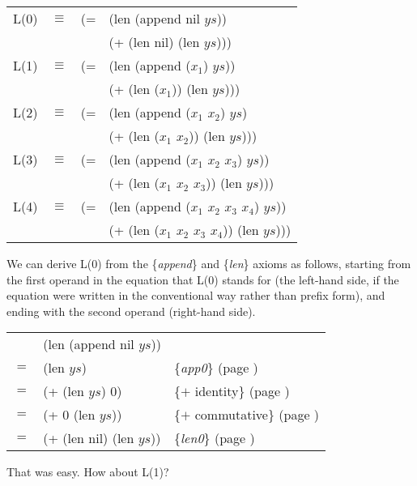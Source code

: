 \begin{center}
\begin{tabular}{llll}
L(0) & $\equiv$ & (= &(len (append nil $ys$)) \\
     &          &    &(+ (len nil) (len $ys$))) \\
L(1) & $\equiv$ & (= &(len (append ($x_1$) $ys$)) \\
     &          &    &(+ (len ($x_1$)) (len $ys$))) \\
L(2) & $\equiv$ & (= &(len (append ($x_1$ $x_2$) $ys$) 	\\
	 &          &    &(+ (len ($x_1$ $x_2$)) (len $ys$))) \\
L(3) & $\equiv$ & (= &(len (append ($x_1$ $x_2$ $x_3$) $ys$)) \\
     &          &    &(+ (len ($x_1$ $x_2$ $x_3$)) (len $ys$))) \\
L(4) & $\equiv$ & (= &(len (append ($x_1$ $x_2$ $x_3$ $x_4$) $ys$)) \\
     &          &    &(+ (len ($x_1$ $x_2$ $x_3$ $x_4$)) (len $ys$)))
\end{tabular}
\end{center}

We can derive L(0) from the \{\emph{append}\} and \{\emph{len}\} axioms as follows, 
starting from the first operand in the equation that L(0) stands for 
(the left-hand side, if the equation were written in the conventional way rather than prefix form), 
and ending with the second operand (right-hand side).

\begin{center}
\begin{tabular}{lll}
    & (len (append nil $ys$))  &                                                \\
$=$ & (len $ys$)               & \{\emph{app0}\}     (page \pageref{append-equations})\\
$=$ & (+ (len $ys$) 0)         & \{$+$ identity\}    (page \pageref{fig-02-01}) \\
$=$ & (+ 0 (len $ys$))         & \{$+$ commutative\} (page \pageref{fig-02-01}) \\
$=$ & (+ (len nil) (len $ys$)) & \{\emph{len0}\}     (page \pageref{len-equations})
\end{tabular}
\end{center}

That was easy. How about L(1)?

